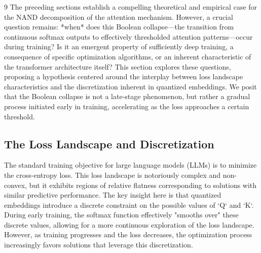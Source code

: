 \documentclass[11pt]{article}
\theoremstyle{definition}
\begin{document}
\begin{thebibliography}{9}
The preceding sections establish a compelling theoretical and empirical case for the NAND decomposition of the attention mechanism. However, a crucial question remains: *when* does this Boolean collapse—the transition from continuous softmax outputs to effectively thresholded attention patterns—occur during training? Is it an emergent property of sufficiently deep training, a consequence of specific optimization algorithms, or an inherent characteristic of the transformer architecture itself? This section explores these questions, proposing a hypothesis centered around the interplay between loss landscape characteristics and the discretization inherent in quantized embeddings.  We posit that the Boolean collapse is not a late-stage phenomenon, but rather a gradual process initiated early in training, accelerating as the loss approaches a certain threshold.













\subsection{The Loss Landscape and Discretization}













The standard training objective for large language models (LLMs) is to minimize the cross-entropy loss.  This loss landscape is notoriously complex and non-convex, but it exhibits regions of relative flatness corresponding to solutions with similar predictive performance.  The key insight here is that quantized embeddings introduce a discrete constraint on the possible values of `Q` and `K`.  During early training, the softmax function effectively "smooths over" these discrete values, allowing for a more continuous exploration of the loss landscape. However, as training progresses and the loss decreases, the optimization process increasingly favors solutions that leverage this discretization.














\end{thebibliography}
\end{document}
